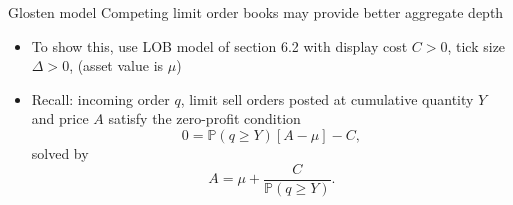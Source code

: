 \documentclass[english,10pt
,aspectratio=169
]{beamer}
\begin{document}
%
%


\begin{frame}{Glosten model}
	Competing limit order books may provide better aggregate depth
	\begin{itemize}
		\item To show this, use LOB model of section 6.2 with display cost $C>0$, tick size $\Delta >0$,  (asset value is $\mu$)
		\item Recall: incoming order $q$, limit sell orders posted at cumulative quantity $Y$ and price $A$ satisfy the zero-profit condition
		\[
		0 = \mathbb{P}(q \geq Y)[A-\mu]-C,
		\]
		solved by 
		\begin{equation} \tag{6.7}
		A= \mu + \frac{C}{\mathbb{P}(q \geq Y)}.
		\end{equation}
	\end{itemize}
\end{frame}
\end{document}
